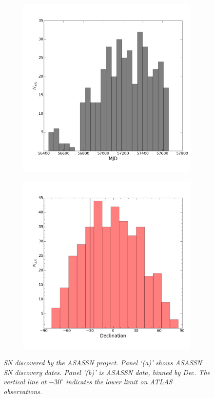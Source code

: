 \documentclass[aps,prb,twocolumn,superscriptaddress]{revtex4-1}
\begin{document}
\begin{figure}
	\centering
	\begin{subfigure}{.5\textwidth}
	  \centering
	  \includegraphics[width=1\linewidth]{figures/mjd_histo_step50.png}
		\caption{\it \small{ }}
		\label{fig:mjdhist}
	\end{subfigure}%
	\begin{subfigure}{.5\textwidth}
	  \centering
			\includegraphics[width=1\linewidth]{figures/dec_histo_step10.png}
		\caption{\it \small{ }}
		\label{fig:dechist}
	\end{subfigure}
	\caption{\it \small{SN discovered by the ASASSN project.  Panel `(a)' shows ASASSN SN discovery dates.  Panel `(b)' is ASASSN data, binned by Dec. The vertical line at $-30^{\circ}$ indicates the lower limit on ATLAS observations.}}
	\label{fig:asnhist}
\end{figure}
\end{document}
